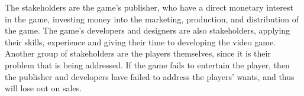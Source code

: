 \documentclass{article}
\begin{document}
The stakeholders are the game's publisher, who have a direct monetary interest in the game, investing money into the marketing, production, and distribution of the game. The game's developers and designers are also stakeholders, applying their skills, experience and giving their time to developing the video game. Another group of stakeholders are the players themselves, since it is their problem that is being addressed. If the game fails to entertain the player, then the publisher and developers have failed to address the players' wants, and thus will lose out on sales.\\





\end{document}
